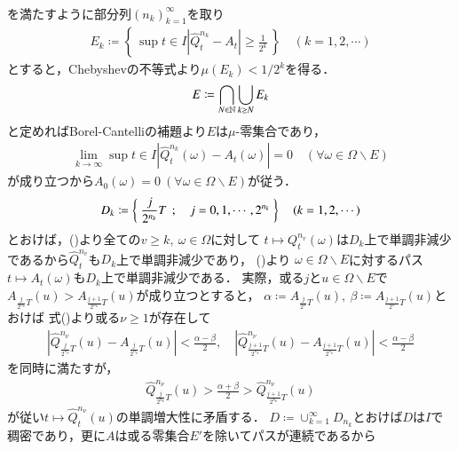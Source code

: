 \begin{prf}
\begin{description}
\begin{align}
				\end{align}
				を満たすように部分列$(n_k)_{k=1}^{\infty}$を取り
				\begin{align}
					E_k \coloneqq \left\{\, \sup{t \in I}{\left| \hat{Q}_t^{n_k} - A_t \right|} \geq \frac{1}{2^k} \, \right\} \quad (k=1,2,\cdots)
				\end{align}
				とすると，Chebyshevの不等式より$\mu(E_k) < 1/2^k$を得る．
				\begin{align}
					E \coloneqq \bigcap_{N \in \mathbb{N}} \bigcup_{k \geq N} E_k
				\end{align}
				と定めればBorel-Cantelliの補題より$E$は$\mu$-零集合であり，
				\begin{align}
					\lim_{k \to \infty}\sup{t \in I}{\left| \hat{Q}_t^{n_k}(\omega) - A_t(\omega) \right|} = 0 
					\quad (\forall \omega \in \Omega \backslash E)
					\label{eq:thm_quadratic_variation_1}
				\end{align}
				が成り立つから$A_0(\omega) = 0 \ (\forall \omega \in \Omega \backslash E)$が従う．
				\begin{align}
					D_k \coloneqq \left\{\ \frac{j}{2^{n_k}}T\ \, ; \quad  j = 0,1,\cdots,2^{n_k} \ \right\} \quad (k=1,2,\cdots)
				\end{align}
				とおけば，()より全ての$v \geq k,\ \omega \in \Omega$に対して
				$t \longmapsto Q_t^{n_v}(\omega)$は$D_k$上で単調非減少であるから$\hat{Q}_t^{n_v}$も$D_k$上で単調非減少であり，
				()より
				$\omega \in \Omega \backslash E$に対するパス$t \longmapsto A_t(\omega)$も$D_k$上で単調非減少である．
				実際，或る$j$と$u \in \Omega \backslash E$で$A_{\frac{j}{2^{n_k}}T}(u) > A_{\frac{j+1}{2^{n_k}}T}(u)$が成り立つとすると，
				$\alpha \coloneqq A_{\frac{j}{2^n}T}(u),\ \beta \coloneqq A_{\frac{j+1}{2^n}T}(u)$とおけば
				式()より或る$\nu \geq 1$が存在して
				\begin{align}
					\left| \hat{Q}_{\frac{j}{2^{n_k}}T}^{n_\nu}(u) - A_{\frac{j}{2^{n_k}}T}(u) \right| < \frac{\alpha - \beta}{2},
					\quad \left| \hat{Q}_{\frac{j+1}{2^{n_k}}T}^{n_\nu}(u) - A_{\frac{j+1}{2^{n_k}}T}(u) \right| < \frac{\alpha - \beta}{2}
				\end{align}
				を同時に満たすが，
				\begin{align}
					\hat{Q}_{\frac{j}{2^{n_k}}T}^{n_\nu}(u) > \frac{\alpha + \beta}{2} > \hat{Q}_{\frac{j+1}{2^{n_k}}T}^{n_\nu}(u)
				\end{align}
				が従い$t \longmapsto \hat{Q}_t^{n_\nu}(u)$の単調増大性に矛盾する．
				$D \coloneqq \cup_{k=1}^{\infty} D_{n_k}$とおけば$D$は$I$で稠密であり，更に$A$は或る零集合$E'$を除いてパスが連続であるから

\end{description}
\end{prf}
